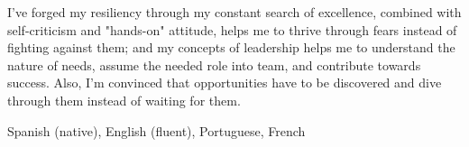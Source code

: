 
\begin{cvparagraph}
	I've forged my resiliency through my constant search of excellence, combined with self-criticism and "hands-on" attitude, helps me to thrive through fears instead of fighting against them; and my concepts of leadership helps me to understand the nature of needs, assume the needed role into team, and contribute towards success. Also, I'm convinced that opportunities have to be discovered and dive through them instead of waiting for them.
\end{cvparagraph}


\begin{cvparagraph}
	{Spanish (native), English (fluent), Portuguese, French} %
\end{cvparagraph}

